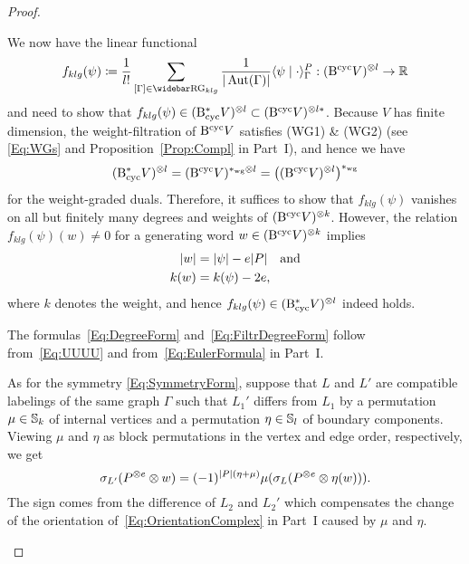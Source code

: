 \documentclass[\MainFolder/Text.tex]{subfiles}
\begin{document}
\begin{proof}
\begin{ProofList}
We now have the linear functional 
$$ f_{klg}(\psi) \coloneqq \frac{1}{l!}\sum_{[\Gamma]\in \RRG_{klg} } \frac{1}{\Abs{\Aut(\Gamma)}} \langle \psi \mid \cdot \rangle_\Gamma^{\PKer}: (\BCyc V)^{\otimes l} \rightarrow \R $$ 
and need to show that $f_{klg}(\psi)\in (\mathrm{B}_{\mathrm{cyc}}^* V)^{\otimes l} \subset (\mathrm{B}^{\mathrm{cyc}} V)^{\otimes l*}$. Because $V$ has finite dimension, the weight-filtration of $\mathrm{B}^{\mathrm{cyc}} V$ satisfies (WG1) \& (WG2) (see \eqref{Eq:WGs} and Proposition~\ref{Prop:Compl} in Part~I), and hence we have
$$ (\mathrm{B}_{\mathrm{cyc}}^* V)^{\otimes l} = (\mathrm{B}^{\mathrm{cyc}} V)^{*_{\mathrm{wg}} \otimes l} =\bigl((\mathrm{B}^{\mathrm{cyc}} V)^{\otimes l}\bigr)^{*_{\mathrm{wg}}} $$
for the weight-graded duals. Therefore, it suffices to show that $f_{klg}(\psi)$ vanishes on all but finitely many degrees and weights of $(\mathrm{B}^{\mathrm{cyc}} V)^{\otimes k}$. However, the relation $f_{klg}(\psi)(w) \neq 0$ for a generating word $w\in (\mathrm{B}^{\mathrm{cyc}} V)^{\otimes k}$ implies
\begin{equation}\label{Eq:UUUU}
\begin{aligned}
|w| &= |\psi| - e |P|\quad\text{and} \\
k(w) &= k(\psi) - 2 e,
\end{aligned}
\end{equation}
where $k$ denotes the weight, and hence $f_{klg}(\psi)\in (\mathrm{B}_{\mathrm{cyc}}^* V)^{\otimes l}$ indeed holds.

\item The formulas~\eqref{Eq:DegreeForm} and~\eqref{Eq:FiltrDegreeForm} follow from~\eqref{Eq:UUUU} and from~\eqref{Eq:EulerFormula} in Part~I.

As for the symmetry \eqref{Eq:SymmetryForm}, suppose that $L$ and $L'$ are compatible labelings of the same graph $\Gamma$ such that $L_1'$ differs from $L_1$ by a permutation $\mu\in \mathbb{S}_{k}$ of internal vertices and a permutation $\eta\in \mathbb{S}_l$ of boundary components. Viewing $\mu$ and $\eta$ as block permutations in the vertex and edge order, respectively, we get
$$ \sigma_{L'}(P^{\otimes e}\otimes w)=(-1)^{|P|(\eta+\mu)}\mu(\sigma_L(P^{\otimes e}\otimes \eta( w))). $$
The sign comes from the difference of $L_2$ and $L_2'$ which compensates the change of the orientation of~\eqref{Eq:OrientationComplex} in Part~I caused by $\mu$ and $\eta$.\qedhere
\end{ProofList}
\end{proof}
\end{document}
